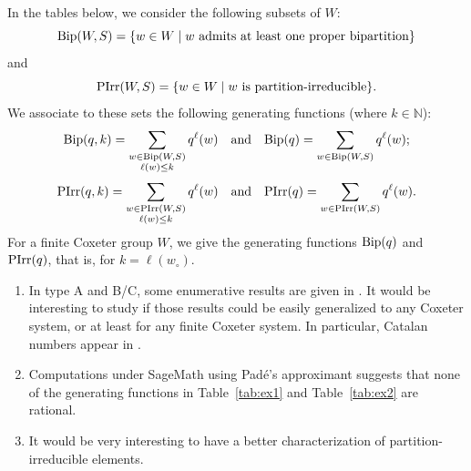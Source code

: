 \documentclass[ALCO,Unicode]{cedram}
\theoremstyle{definition}
\begin{document}
In the tables below, we consider the following subsets of $W$:
\newcommand{\bip}{\textnormal{Bip}}
\newcommand{\pirr}{\textnormal{PIrr}}
$$
\bip(W,S)=\{w\in W\mid w\textrm{ admits at least one proper bipartition}\}
$$
and
$$
 \pirr(W,S)=\{w\in W\mid w\textrm{ is partition-irreducible}\}.
$$
We associate to these sets the following generating functions (where $k\in\mathbb N$):
$$
\bip(q,k)=\sum_{\substack{w\in \bip(W,S)\\ \ell(w)\leq k}} q^\ell(w)\quad\textrm{and}\quad\bip(q)=\sum_{w\in \bip(W,S)} q^\ell(w);
$$
$$
\pirr(q,k)=\sum_{\substack{w\in \pirr(W,S)\\ \ell(w)\leq k}} q^\ell(w)\quad\textrm{and}\quad \pirr(q)=\sum_{w\in \pirr(W,S)} q^\ell(w).
$$
For a finite Coxeter group $W$, we give the generating functions $\bip(q)$ and $ \pirr(q)$, that is, for $k=\ell(w_\circ)$. 

\begin{remarks}
\begin{enumerate}
\item In type A and B/C, some enumerative results are given in \cite[\S6]{DeDiRo17}. It would be interesting to study if those results could be easily generalized to any Coxeter system, or at least for any finite Coxeter system. In particular, Catalan numbers appear in  \cite[Lemma 6.1]{DeDiRo17}. 
\item Computations under SageMath using Pad\'e's approximant suggests that none of the generating functions in Table~\ref{tab:ex1} and Table~\ref{tab:ex2} are rational.
\item It would be very interesting to have a better characterization of partition-irreducible elements. 
\end{enumerate}
\end{remarks}
\end{document}

